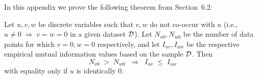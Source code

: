\documentclass[twoside,11pt]{article}
\newcommand{\dataset}{{\cal D}}
\begin{document}


In this appendix we prove the following theorem from
Section~6.2:


\begin{theorem}
Let $u,v,w$ be discrete variables such that $v, w$ do
not co-occur with $u$ (i.e., $u\neq0\;\Rightarrow \;v=w=0$ in a given
dataset $\dataset$). Let $N_{v0},N_{w0}$ be the number of data points for
which $v=0, w=0$ respectively, and let $I_{uv},I_{uw}$ be the
respective empirical mutual information values based on the sample
$\dataset$. Then
\[ N_{v0} \;>\; N_{w0}\;\;\Rightarrow\;\;I_{uv} \;\leq\;I_{uw} \]
with equality only if $u$ is identically 0.
\end{theorem}






\vskip 0.2in

\end{document}
